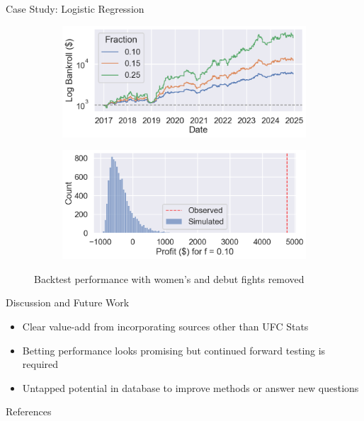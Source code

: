 \documentclass[final]{beamer}
\newlength{\colwidth}
\begin{document}
\begin{frame}[t]
\begin{columns}[t]
\begin{column}{\colwidth}
\begin{block}{Case Study: Logistic Regression}
      \begin{figure}
        \centering
        \captionsetup{justification=centering}
        \begin{subfigure}{.49\linewidth}
            \centering
            \includegraphics[width=\linewidth]{figures/lr_case_study_bankroll.png}
        \end{subfigure}
        \begin{subfigure}{.49\linewidth}
            \centering
            \includegraphics[width=\linewidth]{figures/lr_case_study_0.1_null_dist.png}
        \end{subfigure}
        \caption{Backtest performance with women's and debut fights removed}
    \end{figure}
  \end{block}
\vspace{-6pt}
  \begin{block}{Discussion and Future Work}
      \begin{itemize}
          \item Clear value-add from incorporating sources other than UFC Stats

          \item Betting performance looks promising but continued forward testing is required

          \item Untapped potential in database to improve methods or answer new questions
      \end{itemize}
  \end{block}
\vspace{-6pt}
  \begin{block}{References}


\end{block}
\end{column}
\end{columns}
\end{frame}
\end{document}
